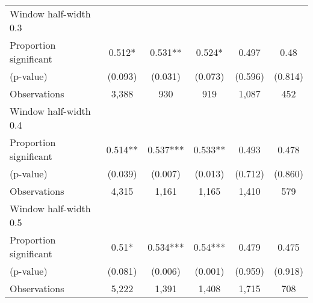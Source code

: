 \begin{tabular}{l*{5}{c}}
\hline
Window half-width 0.3\\

Proportion significant& 0.512* &  0.531** &  0.524* &  0.497 &  0.48\\

(p-value) & (0.093) &  (0.031) &  (0.073) &  (0.596) &  (0.814)\\

Observations& 3,388 &  930 &  919 &  1,087 &  452\\

\hline
Window half-width 0.4\\

Proportion significant& 0.514** &  0.537*** &  0.533** &  0.493 &  0.478\\

(p-value) & (0.039) &  (0.007) &  (0.013) &  (0.712) &  (0.860)\\

Observations& 4,315 &  1,161 &  1,165 &  1,410 &  579\\

\hline
Window half-width 0.5\\

Proportion significant& 0.51* &  0.534*** &  0.54*** &  0.479 &  0.475\\

(p-value) & (0.081) &  (0.006) &  (0.001) &  (0.959) &  (0.918)\\

Observations& 5,222 &  1,391 &  1,408 &  1,715 &  708\\

\hline\hline
\end{tabular}

